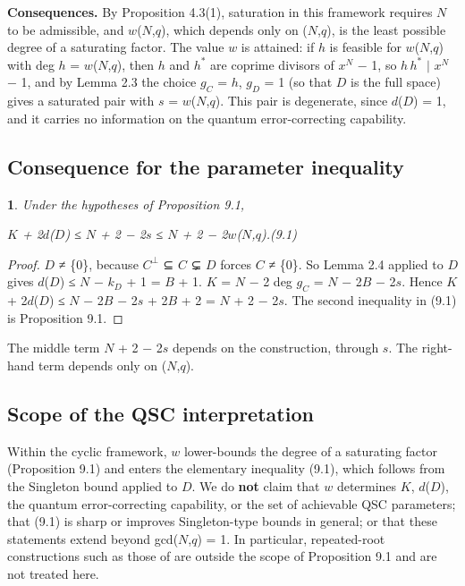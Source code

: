 \documentclass[pdflatex,sn-mathphys-num]{sn-jnl}
\theoremstyle{thmstyleone}
\newcommand{\thmxname}{}
\newtheorem*{thmxinner}{\thmxname}
\newenvironment{thmx}[1]{\renewcommand{\thmxname}{#1}\begin{thmxinner}}{\end{thmxinner}}
\theoremstyle{thmstylethree}
\begin{document}
\textbf{Consequences.} By Proposition 4.3(1), saturation in this framework requires \(N\) to be admissible, and \(w\)(\(N\),\(q\)), which depends only on (\(N\),\(q\)), is the least possible degree of a saturating factor. The value \(w\) is attained: if \(h\) is feasible for \(w\)(\(N\),\(q\)) with deg \(h\) = \(w\)(\(N\),\(q\)), then \(h\) and \(h^{*}\) are coprime divisors of \(x^N\) − 1, so \(h\,h^{*}\) \(\mid\) \(x^N\) − 1, and by Lemma 2.3 the choice \(g_C\) = \(h\), \(g_D\) = 1 (so that \(D\) is the full space) gives a saturated pair with \(s\) = \(w\)(\(N\),\(q\)). This pair is degenerate, since \(d\)(\(D\)) = 1, and it carries no information on the quantum error-correcting capability.

\subsection{Consequence for the parameter inequality}

\begin{thmx}{Corollary 9.2}

Under the hypotheses of Proposition 9.1,

\begin{center}\(K\) + 2\(d\)(\(D\)) ≤ \(N\) + 2 − 2\(s\) ≤ \(N\) + 2 − 2\(w\)(\(N\),\(q\)).\qquad (9.1)\end{center}

\end{thmx}

\begin{proof}[Proof]

\(D\) ≠ \{0\}, because \(C^⊥\) ⊆ \(C\) ⊊ \(D\) forces \(C\) ≠ \{0\}. So Lemma 2.4 applied to \(D\) gives \(d\)(\(D\)) ≤ \(N\) − \(k_D\) + 1 = \(B\) + 1. \(K\) = \(N\) − 2 deg \(g_C\) = \(N\) − 2\(B\) − 2\(s\). Hence \(K\) + 2\(d\)(\(D\)) ≤ \(N\) − 2\(B\) − 2\(s\) + 2\(B\) + 2 = \(N\) + 2 − 2\(s\). The second inequality in (9.1) is Proposition 9.1.

\end{proof}

The middle term \(N\) + 2 − 2\(s\) depends on the construction, through \(s\). The right-hand term depends only on (\(N\),\(q\)).

\subsection{Scope of the QSC interpretation}

Within the cyclic framework, \(w\) lower-bounds the degree of a saturating factor (Proposition 9.1) and enters the elementary inequality (9.1), which follows from the Singleton bound applied to \(D\). We do \textbf{not} claim that \(w\) determines \(K\), \(d\)(\(D\)), the quantum error-correcting capability, or the set of achievable QSC parameters; that (9.1) is sharp or improves Singleton-type bounds in general; or that these statements extend beyond gcd(\(N\),\(q\)) = 1. In particular, repeated-root constructions such as those of \cite{DMLHW20} are outside the scope of Proposition 9.1 and are not treated here.
\end{document}
